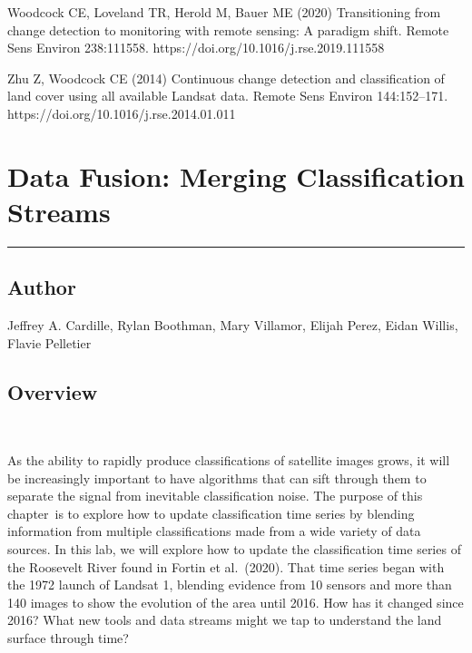 \documentclass[
  letterpaper,
  DIV=11,
  numbers=noendperiod]{scrreprt}
\begin{document}
Woodcock CE, Loveland TR, Herold M, Bauer ME (2020) Transitioning from
change detection to monitoring with remote sensing: A paradigm shift.
Remote Sens Environ 238:111558.
https://doi.org/10.1016/j.rse.2019.111558

Zhu Z, Woodcock CE (2014) Continuous change detection and classification
of land cover using all available Landsat data. Remote Sens Environ
144:152--171. https://doi.org/10.1016/j.rse.2014.01.011

\hypertarget{data-fusion-merging-classification-streams}{%
\chapter{Data Fusion: Merging Classification
Streams}\label{data-fusion-merging-classification-streams}}

\begin{center}\rule{0.5\linewidth}{0.5pt}\end{center}

\hypertarget{author-13}{%
\section*{Author}\label{author-13}}


Jeffrey A. Cardille, Rylan Boothman, Mary Villamor, Elijah Perez, Eidan
Willis, Flavie Pelletier

\hypertarget{overview-15}{%
\section*{Overview}\label{overview-15}}


~

As the ability to rapidly produce classifications of satellite images
grows, it will be increasingly important to have algorithms that can
sift through them to separate the signal from inevitable classification
noise. The purpose of this chapter~is to explore how to update
classification time series by blending information from multiple
classifications made from a wide variety of data sources. In this lab,
we will explore how to update the classification time series of the
Roosevelt River found in Fortin et al.~(2020). That time series began
with the 1972 launch of Landsat 1, blending evidence from 10 sensors and
more than 140 images to show the evolution of the area until 2016. How
has it changed since 2016? What new tools and data streams might we tap
to understand the land surface through time?
\end{document}
